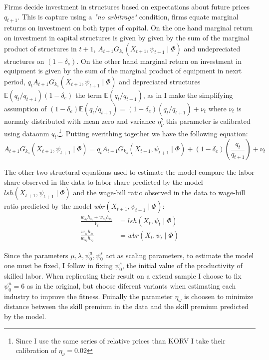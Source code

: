 \documentclass[12pt]{article}
\begin{document}
Firms decide investment in structures based on expectations about future prices $q_{t+1}$. This is capture using a \textit{"no arbitrage"} condition, firms equate marginal returns on investment on  both types of capital. On the one hand marginal return on investment in capital structures is given by given by the sum of the marginal product of structures in $t+1$, $A_{t+1} G_{k_s}(X_{t+1}, \psi_{t+1} \mid \Phi )$ and undepreciated structures on $(1-\delta_s)$. On the other hand marginal return on investment in equipment is given by the sum of the marginal product of equipment in nexrt period, $q_t A_{t+1} G_{k_s}(X_{t+1}, \psi_{t+1} \mid \Phi )$  and depreciated structures $\mathbb{E}(q_t/q_{t+1})(1-\delta_e)$ the term $\mathbb{E}(q_t/q_{t+1})$, as in \citep{krusell2000capital} I make the simplifying assumption of 
$(1-\delta_e)\mathbb{E}(q_t/q_{t+1}) =(1-\delta_e)(q_t/q_{t+1}) + \nu_t$ where $\nu_t$ is normaly distributed with mean zero and variance $\eta_\nu^2$ this parameter is calibrated using dataonm $q_t$.\footnote{Since I use the same series of relative prices than KORV I take their calibration of $\eta_\nu = 0.02$}. Putting everithing together we have the following equation:
\begin{equation}\label{eq:no_arbitrage}
  A_{t+1} G_{k_s}(X_{t+1}, \psi_{t+1} \mid \Phi ) = q_t A_{t+1} G_{k_s}(X_{t+1}, \psi_{t+1} \mid \Phi ) + (1-\delta_e)\left(\frac{q_t}{q_{t+1}}\right) + \nu_t
\end{equation}

The other two structural equations used to estimate the model compare the labor share observed in the data to labor share predicted by the model $lsh(X_{t+1}, \psi_{t+1} \mid \Phi )$ and the wage-bill ratio observed in the data to wage-bill ratio predicted by the model $wbr(X_{t+1}, \psi_{t+1} \mid \Phi )$:
\begin{align}
  \frac{w_{s_t}h_{s_t} + w_{u_t}h_{u_t} }{Y_t} &= lsh(X_{t}, \psi_{t} \mid \Phi ) \label{eq:labor_share}\\
  \frac{w_{s_t}h_{s_t}}{w_{u_t}h_{u_t}} &= wbr(X_{t}, \psi_{t} \mid \Phi ) \label{eq:wage_bill_ratio}
\end{align}

Since the parameters $\mu, \lambda, \psi^u_0, \psi^s_0$ act as scaling parameters, to estimate the model one must be fixed, I follow \citep{krusell2000capital} in fixing $\psi^s_0$, the initial value of the productivity of skilled labor. When replicating their result on a extend sample I choose to fix $\psi^u_0 = 6$ as in the original, but choose diferent variants when estimating each industry to improve the fitness. Fuinally the parameter $\eta_\omega$ is choosen to minimize distance between the skill premium in the data and the skill premium predicted by the model.
\end{document}
